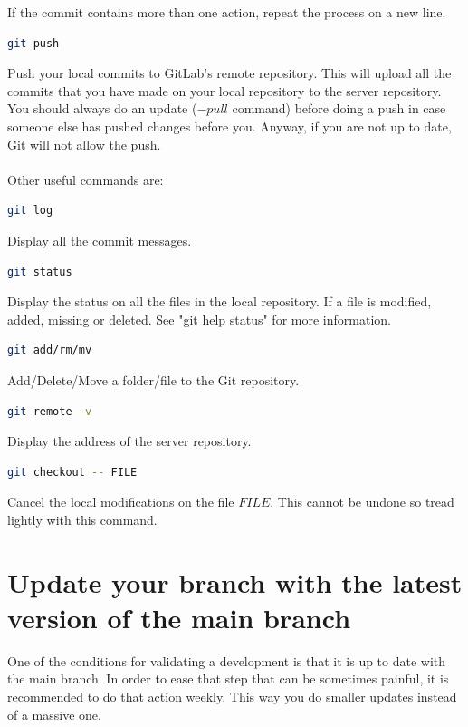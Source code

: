 If the commit contains more than one action, repeat the process on a new line.
%
\begin{lstlisting}[language=bash]
git push
\end{lstlisting}
Push your local commits to GitLab's remote repository. This will upload all the
commits that you have made on your local repository to the server repository.
You should always do an update ($-pull$ command) before doing a push in case
someone else has pushed changes before you. Anyway, if you are not up to date,
Git will not allow the push.\\
%
\\
Other useful commands are:
\begin{lstlisting}[language=bash]
git log
\end{lstlisting}
Display all the commit messages.
%
\begin{lstlisting}[language=bash]
git status
\end{lstlisting}
Display the status on all the files in the local repository. If a file is
modified, added, missing or deleted. See "git help status" for more
information.
%
\begin{lstlisting}[language=bash]
git add/rm/mv
\end{lstlisting}
Add/Delete/Move a folder/file to the Git repository.
%
\begin{lstlisting}[language=bash]
git remote -v
\end{lstlisting}
Display the address of the server repository.
%
\begin{lstlisting}[language=bash]
git checkout -- FILE
\end{lstlisting}
Cancel the local modifications on the file $FILE$. This cannot be undone so
tread lightly with this command.
%
\section{Update your branch with the latest version of the main branch}
%
One of the conditions for validating a development is that it is up to date
with the main branch. In order to ease that step that can be sometimes painful,
it is recommended to do that action weekly. This way you do smaller updates
instead of a massive one.
